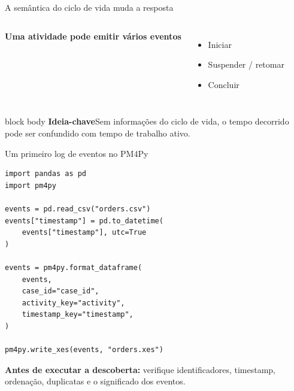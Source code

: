 \documentclass[aspectratio=169,11pt]{beamer}
\newcommand{\keyidea}[1]{%
  \begin{beamercolorbox}[rounded=true,sep=0.65em]{block body}
    \textbf{\color{Teal}Ideia-chave}\quad #1
  \end{beamercolorbox}
}
\begin{document}
\begin{frame}{A semântica do ciclo de vida muda a resposta}
  \begin{columns}[T,onlytextwidth]
      \textbf{Uma atividade pode emitir vários eventos}
      \begin{itemize}
        \item Iniciar
        \item Suspender / retomar
        \item Concluir
      \end{itemize}
  \end{columns}
  \vspace{0.45cm}
  \keyidea{Sem informações do ciclo de vida, o tempo decorrido pode ser confundido com tempo de trabalho ativo.}
\end{frame}

\begin{frame}[fragile]{Um primeiro log de eventos no PM4Py}
\begin{lstlisting}[style=python]
import pandas as pd
import pm4py

events = pd.read_csv("orders.csv")
events["timestamp"] = pd.to_datetime(
    events["timestamp"], utc=True
)

events = pm4py.format_dataframe(
    events,
    case_id="case_id",
    activity_key="activity",
    timestamp_key="timestamp",
)

pm4py.write_xes(events, "orders.xes")
\end{lstlisting}
  \vspace{0.15cm}
  \textbf{Antes de executar a descoberta:} verifique identificadores, timestamp, ordenação, duplicatas e o significado dos eventos.
\end{frame}
\end{document}
